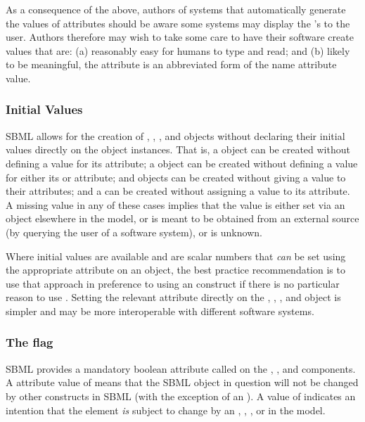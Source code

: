 As a consequence of the above, authors of systems that
automatically generate the values of  attributes should
be aware some systems may display the 's to the user.
Authors therefore may wish to take some care to have their
software create  values that are: (a) reasonably easy
for humans to type and read; and (b) likely to be meaningful, \eg
the  attribute is an abbreviated form of the name
attribute value.


\subsubsection{Initial Values}
\label{sec:bp:initialvalues}

SBML allows for the creation of \Compartment, \Species,
\Parameter, \LocalParameter and \SpeciesReference objects without
declaring their initial values directly on the object instances.
That is, a \Compartment object can be created without defining a
value for its  attribute; a \Species object can be
created without defining a value for either its
 or  attribute;
\Parameter and \LocalParameter objects can be created without
giving a value to their  attributes; and a
\SpeciesReference can be created without assigning a value to its
 attribute.  A missing value in any of these
cases implies that the value is either set via an
\InitialAssignment object elsewhere in the model, or is meant to
be obtained from an external source (\eg by querying the user of a
software system), or is unknown.

Where initial values are available and are scalar numbers that
\emph{can} be set using the appropriate attribute on an object,
the best practice recommendation is to use that approach in
preference to using an \InitialAssignment construct if there is no
particular reason to use \InitialAssignment.  Setting the relevant
attribute directly on the \Compartment, \Species, \Parameter,
\LocalParameter and \SpeciesReference object is simpler and may be
more interoperable with different software systems.


\subsubsection{The  flag}
\label{sec:bp:constant}

SBML provides a mandatory boolean attribute called
 on the \Compartment, \Species, \SpeciesReference and
\Parameter components.  A  attribute value of
 means that the SBML object in question will not be
changed by other constructs in SBML (with the exception of an
\InitialAssignment).  A value of  indicates an
intention that the element \emph{is} subject to change by an
\AssignmentRule, \RateRule, \AlgebraicRule, \Reaction or \Event in
the model.

